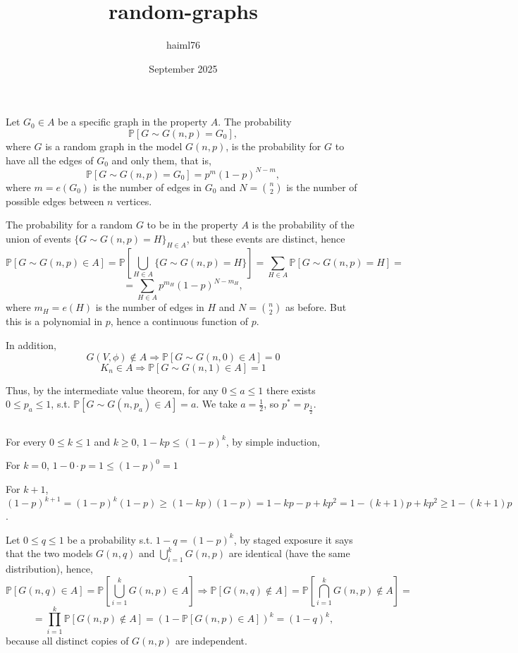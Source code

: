 \documentclass{article}
\title{random-graphs}
\author{haiml76 }
\date{September 2025}
\begin{document}
\maketitle

\section{}
\subsection{}
Let $G_0\in{A}$ be a specific graph in the property $A$. The probability \[\mathbb{P}[G\sim{G(n,p)}=G_0],\]
where $G$ is a random graph in the model $G(n,p)$, is the probability for $G$ to have all the edges of $G_0$ and only them, that is,
\[\mathbb{P}[G\sim{G(n,p)}=G_0]=p^m(1-p)^{N-m},\]
where $m=e(G_0)$ is the number of edges in $G_0$ and $N=\binom{n}{2}$ is the number of possible edges between $n$ vertices.

The probability for a random $G$ to be in the property $A$ is the probability of the union of events $\{G\sim{G(n,p)}=H\}_{H\in{A}}$, but these events are distinct, hence \[\mathbb{P}[G\sim{G(n,p)}\in{A}]=\mathbb{P}[\bigcup_{H\in{A}}\{G\sim{G(n,p)}=H\}]=\sum_{H\in{A}}\mathbb{P}[G\sim{G(n,p)}=H]=\]\[=\sum_{H\in{A}}p^{m_H}(1-p)^{N-m_H},\]
where $m_H=e(H)$ is the number of edges in $H$ and $N=\binom{n}{2}$ as before. But this is a polynomial in $p$, hence a continuous function of $p$. 

In addition,
\[G(V,\phi)\notin{A}\Rightarrow\mathbb{P}[G\sim{G(n,0)}\in{A}]=0\]\[K_n\in{A}\Rightarrow\mathbb{P}[G\sim{G(n,1)}\in{A}]=1\]

Thus, by the intermediate value theorem, for any $0\leq{a}\leq{1}$ there exists $0\leq{p_a}\leq{1}$, s.t. $\mathbb{P}[G\sim{G(n,p_a)}\in{A}]=a$. We take $a=\frac{1}{2}$, so $p^\ast=p_\frac{1}{2}$.
\subsection{}
For every $0\leq{k}\leq{1}$ and $k\geq{0}$, $1-kp\leq(1-p)^k$, by simple induction,

For $k=0$, $1-0\cdot{p}=1\leq{(1-p)^0}=1$

For $k+1$, $(1-p)^{k+1}=(1-p)^k(1-p)\geq(1-kp)(1-p)=1-kp-p+kp^2=1-(k+1)p+kp^2\geq{1-(k+1)p}$.

Let $0\leq{q}\leq{1}$ be a probability s.t. $1-q=(1-p)^k$, by staged exposure it says that the two models $G(n,q)$ and $\bigcup_{i=1}^kG(n,p)$ are identical (have the same distribution), hence,
\[\mathbb{P}[G(n,q)\in{A}]=\mathbb{P}[\bigcup_{i=1}^kG(n,p)\in{A}]\Rightarrow\mathbb{P}[G(n,q)\notin{A}]=\mathbb{P}[\bigcap_{i=1}^kG(n,p)\notin{A}]=\]\[=\prod_{i=1}^k\mathbb{P}[G(n,p)\notin{A}]=(1-\mathbb{P}[G(n,p)\in{A}])^k=(1-q)^k,\]
because all distinct copies of $G(n,p)$ are independent.
\end{document}
